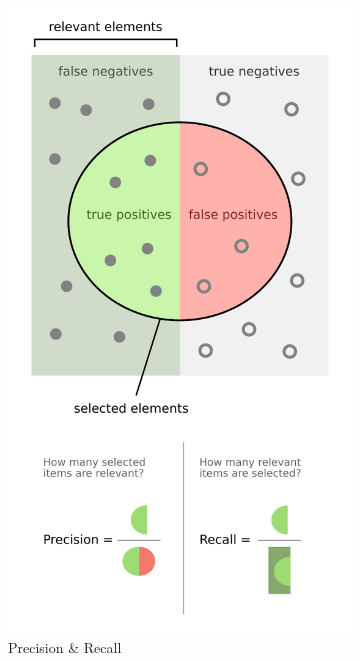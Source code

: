 \begin{figure}[H]
\centering
  \begin{subfigure}[c]{0.48\textwidth}\centering
  \includegraphics[width=\textwidth]{figures/ml/precision_recall}
  \caption{Precision \& Recall}
  \label{fig:graphical_CM_quantities:precision_recall}
  \end{subfigure}
  ~
  \begin{subfigure}[c]{0.48\textwidth}\centering

\end{subfigure}
\end{figure}
